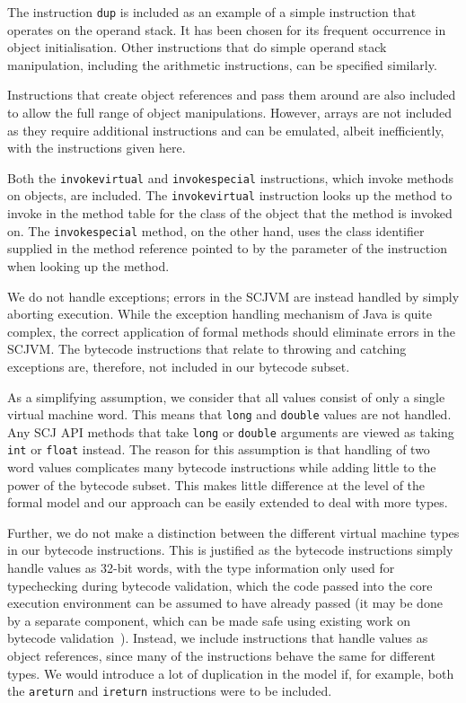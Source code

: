 The instruction \texttt{dup} is included as an example of a simple
instruction that operates on the operand stack.
It has been chosen for its frequent occurrence in object initialisation.
Other instructions that do simple operand stack manipulation,
including the arithmetic instructions, can be specified similarly.

Instructions that create object references and pass them around are
also included to allow the full range of object manipulations.
However, arrays are not included as they require additional
instructions and can be emulated, albeit inefficiently, with the
instructions given here.

Both the \texttt{invokevirtual} and \texttt{invokespecial}
instructions, which invoke methods on objects, are included.
The \texttt{invokevirtual} instruction looks up the method to invoke
in the method table for the class of the object that the method is
invoked on.
The \texttt{invokespecial} method, on the other hand, uses the class
identifier supplied in the method reference pointed to by the
parameter of the instruction when looking up the method.

We do not handle exceptions; errors in the SCJVM are instead handled
by simply aborting execution.
While the exception handling mechanism of Java is quite complex, the
correct application of formal methods should eliminate errors in the
SCJVM.
The bytecode instructions that relate to throwing and catching
exceptions are, therefore, not included in our bytecode subset.

As a simplifying assumption, we consider that all values consist of
only a single virtual machine word.
This means that \texttt{long} and \texttt{double} values are not
handled.
Any SCJ API methods that take \texttt{long} or \texttt{double}
arguments are viewed as taking \texttt{int} or \texttt{float} instead.
The reason for this assumption is that handling of two word values
complicates many bytecode instructions while adding little to the
power of the bytecode subset.
This makes little difference at the level of the formal model and our
approach can be easily extended to deal with more types.

Further, we do not make a distinction between the different virtual
machine types in our bytecode instructions.
This is justified as the bytecode instructions simply handle values as
32-bit words, with the type information only used for typechecking
during bytecode validation, which the code passed into the core
execution environment can be assumed to have already passed (it may be
done by a separate component, which can be made safe using existing
work on bytecode validation~\cite{klein2003, stark2001, coglio2000,
  xavier2003}). 
Instead, we include instructions that handle values as object
references, since many of the instructions behave the same for
different types.
We would introduce a lot of duplication in the model if, for example,
both the \texttt{areturn} and \texttt{ireturn} instructions were to be
included.


